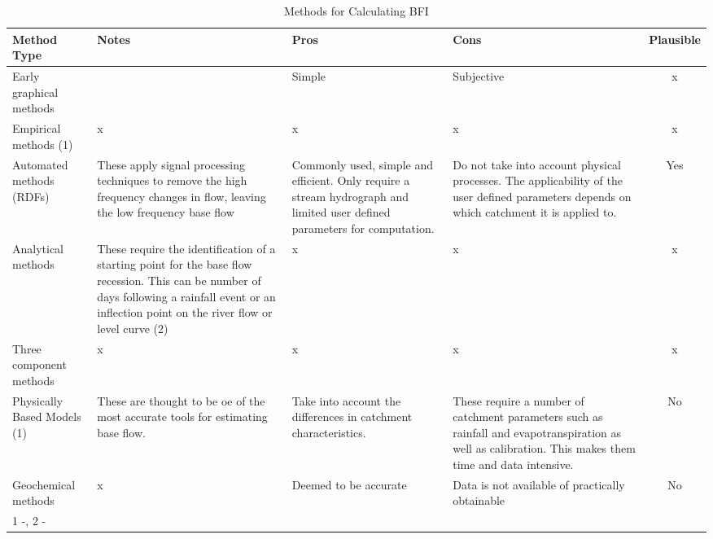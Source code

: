 \documentclass[DIV=calc, paper=a4, fontsize=11pt, twocolumn]{scrartcl}	 %
\begin{document}
\begin{table*}
\caption{Methods for Calculating BFI}
\centering
\begin{tabularx}{\linewidth}{ l X X X c} 
		\toprule
		Method Type & Notes & Pros & Cons & Plausible\\
		\midrule
		
		Early graphical methods &  & Simple & Subjective &x \\
		
		Empirical methods (1) & x  & x & x & x \\
		
		Automated methods (RDFs) & These apply signal processing techniques to remove the high frequency changes in flow, leaving the low frequency base flow & Commonly used, simple and efficient. Only require a stream hydrograph and limited user defined parameters for computation. & Do not take into account physical processes. The applicability of the user defined parameters depends on which catchment it is applied to. & Yes \\
		
		Analytical methods & These require the identification of a starting point for the base flow recession. This can be  number of days following a rainfall event or an inflection point on the river flow or level curve (2) &x &x &x \\
		
		Three component methods &x  &x & x&x \\
		
		Physically Based Models (1) & These are thought to be oe of the most accurate tools for estimating base flow.  & Take into account the differences in catchment characteristics. & These require a number of catchment parameters such as rainfall and evapotranspiration as well as calibration. This makes them time and data intensive. & No \\
		
		Geochemical methods & x & Deemed to be accurate &
		Data is not available of practically obtainable & No\\
	\bottomrule
	\multicolumn{5}{l}{1 -\citet{Li2013}, 2 - \citep{Nejadhashemi2007}}\\
\end{tabularx}
\end{table*}
\end{document}
